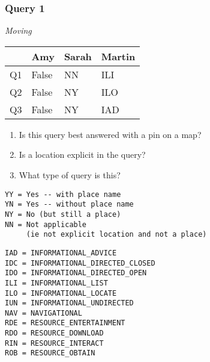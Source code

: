 
\begin{frame}[fragile]
\frametitle{Query 1}
\vspace{1em}

\emph{Moving}

\vfill

\begin{table}
  \centering
  \begin{tabular}{ l l l l }
    & \textbf{Amy} & \textbf{Sarah} & \textbf{Martin}\\
    \toprule
    Q1 & False & NN & ILI\\
Q2 & False & NY & ILO\\
Q3 & False & NY & IAD\\
    \bottomrule
  \end{tabular}
\end{table}

\vfill

\tiny{

\begin{enumerate}
\item Is this query best answered with a pin on a map?
\item Is a location explicit in the query?
\item What type of query is this?
\end{enumerate}

\vfill

\begin{multicols}{2}
\begin{verbatim}
YY = Yes -- with place name
YN = Yes -- without place name
NY = No (but still a place)
NN = Not applicable 
     (ie not explicit location and not a place)
\end{verbatim}

\columnbreak
\begin{verbatim}
IAD = INFORMATIONAL_ADVICE
IDC = INFORMATIONAL_DIRECTED_CLOSED
IDO = INFORMATIONAL_DIRECTED_OPEN
ILI = INFORMATIONAL_LIST
ILO = INFORMATIONAL_LOCATE
IUN = INFORMATIONAL_UNDIRECTED
NAV = NAVIGATIONAL
RDE = RESOURCE_ENTERTAINMENT
RDO = RESOURCE_DOWNLOAD
RIN = RESOURCE_INTERACT
ROB = RESOURCE_OBTAIN
\end{verbatim}
\end{multicols}
}

\end{frame}


